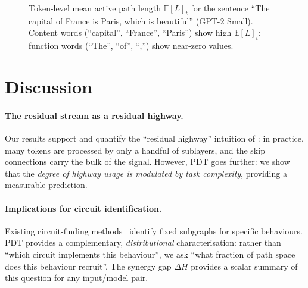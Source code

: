 \documentclass{article}
\newcommand{\E}{\mathbb{E}}
\newcommand{\DeltaH}{\Delta H}
\begin{document}
\begin{figure}[h]
  \centering
  \caption{Token-level mean active path length $\E[L]_t$ for the sentence
  ``The capital of France is Paris, which is beautiful'' (GPT-2 Small).
  Content words (``capital'', ``France'', ``Paris'') show high $\E[L]_t$;
  function words (``The'', ``of'', ``,'') show near-zero values.}
  \label{fig:heatmap}
\end{figure}

\section{Discussion}
\label{sec:discussion}

\paragraph{The residual stream as a residual highway.}
Our results support and quantify the ``residual highway'' intuition of
\citet{veit2016residual}: in practice, many tokens are processed by only a handful
of sublayers, and the skip connections carry the bulk of the signal.
However, PDT goes further: we show that the \emph{degree of highway usage is
modulated by task complexity}, providing a measurable prediction.

\paragraph{Implications for circuit identification.}
Existing circuit-finding methods~\citep{conmy2023automated,lieberum2023does} identify
fixed subgraphs for specific behaviours.  PDT provides a complementary, \emph{distributional}
characterisation: rather than ``which circuit implements this behaviour'', we ask
``what fraction of path space does this behaviour recruit''.  The synergy gap
$\DeltaH$ provides a scalar summary of this question for any input/model pair.
\end{document}
